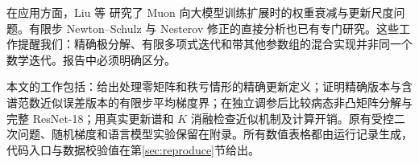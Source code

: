 在应用方面，Liu 等\citep{liu2025} 研究了 Muon 向大模型训练扩展时的权重衰减与更新尺度问题。有限步 Newton--Schulz 与 Nesterov 修正的直接分析也已有专门研究\citep{peng2026}。这些工作提醒我们：精确极分解、有限多项式迭代和带其他参数组的混合实现并非同一个数学迭代。报告中必须明确区分。

本文的工作包括：给出处理零矩阵和秩亏情形的精确更新定义；证明精确版本与含谱范数近似误差版本的有限步平均梯度界；在独立调参后比较病态非凸矩阵分解与完整 ResNet-18；用真实更新谱和 $K$ 消融检查近似机制及计算开销。原有受控二次问题、随机梯度和语言模型实验保留在附录。所有数值表格都由运行记录生成，代码入口与数据校验值在第\ref{sec:reproduce}节给出。
